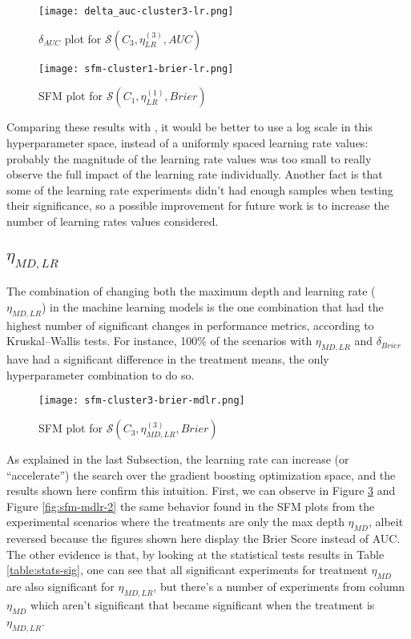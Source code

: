 \begin{figure}[H]
    \centering
    \texttt{[image: delta\_auc-cluster3-lr.png]}
    \caption{$\delta_{AUC}$ plot for $\mathcal{S}(C_3, \eta^{(3)}_{LR}, AUC)$}
    \label{fig:delta-auc-cluster3-lr}
\end{figure}

\begin{figure}[H]
    \centering
    \texttt{[image: sfm-cluster1-brier-lr.png]}
    \caption{SFM plot for $\mathcal{S}(C_1, \eta^{(1)}_{LR}, Brier)$}
    \label{fig:sfm-lr-1}
\end{figure}

Comparing these results with \cite{van2018hyperparameter}, it would be better to use a log scale in this hyperparameter space, instead of a uniformly spaced learning rate values: probably the magnitude of the learning rate values was too small to really observe the full impact of the learning rate individually. Another fact is that some of the learning rate experiments didn't had enough samples when testing their significance, so a possible improvement for future work is to increase the number of learning rates values considered.

\subsection{\texorpdfstring{\Large$\eta_{MD, LR}$}{}}

The combination of changing both the maximum depth and learning rate ($\eta_{MD, LR}$) in the machine learning models is the one combination that had the highest number of significant changes in performance metrics, according to Kruskal–Wallis tests. For instance, 100\% of the scenarios with $\eta_{MD, LR}$ and $\delta_{Brier}$ have had a significant difference in the treatment means, the only hyperparameter combination to do so.


\begin{figure}[H]
    \centering
    \texttt{[image: sfm-cluster3-brier-mdlr.png]}
    \caption{SFM plot for $\mathcal{S}(C_3, \eta^{(3)}_{MD, LR}, Brier)$}
    \label{fig:sfm-mdlr-1}
\end{figure}

As explained in the last Subsection, the learning rate can increase (or ``accelerate'') the search over the gradient boosting optimization space, and the results shown here confirm this intuition. First, we can observe in Figure \ref{fig:sfm-mdlr-1} and Figure \ref{fig:sfm-mdlr-2} the same behavior found in the SFM plots from the experimental scenarios where the treatments are only the max depth $\eta_{MD}$, albeit reversed because the figures shown here display the Brier Score instead of AUC. The other evidence is that, by looking at the statistical tests results in Table \ref{table:stats-sig}, one can see that all significant experiments for treatment $\eta_{MD}$ are also significant for $\eta_{MD, LR}$, but there's a number of experiments from column $\eta_{MD}$ which aren't significant that became significant when the treatment is $\eta_{MD, LR}$. 


